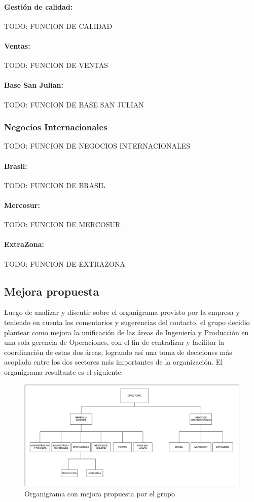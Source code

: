 \documentclass[a4paper,10pt]{article}
\begin{document}
			\paragraph{Gestión de calidad:}
			TODO: FUNCION DE CALIDAD
			\paragraph{Ventas:}
			TODO: FUNCION DE VENTAS
			\paragraph{Base San Julian:}
			TODO: FUNCION DE BASE SAN JULIAN
		\subsubsection{Negocios Internacionales}
			TODO: FUNCION DE NEGOCIOS INTERNACIONALES
			\paragraph{Brasil:}
			TODO: FUNCION DE BRASIL
			\paragraph{Mercosur:}
			TODO: FUNCION DE MERCOSUR
			\paragraph{ExtraZona:}
			TODO: FUNCION DE EXTRAZONA


\subsection{Mejora propuesta}
	Luego de analizar y discutir sobre el organigrama provisto por la empresa y teniendo en cuenta los comentarios y sugerencias del contacto, el grupo decidio plantear como mejora la unificación de las áreas de Ingeniería y Producción en una sola gerencia de Operaciones, con el fin de centralizar y facilitar la coordinación de estas dos áreas, logrando así una toma de deciciones más acoplada entre los dos sectores más importantes de la organización. El organigrama resultante es el siguiente:
	\begin{figure}[H]
		\centering
		\includegraphics[width=15cm]{imagenes/mejoraOrganigrama.png}
		\caption{Organigrama con mejora propuesta por el grupo}
	\end{figure}
\end{document}
